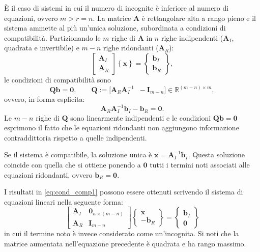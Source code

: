 È il caso di sistemi in cui il numero di incognite è inferiore 	al numero di equazioni, ovvero $m>r=n$. La matrice $\bm{A}$ è 
rettangolare alta a rango pieno e il sistema ammette al più un'unica soluzione, subordinata a condizioni di compatibilit\`a.
Partizionando le $m$ righe di $\bm{A}$ in $n$ righe indipendenti ($\bm{A}_I$, quadrata e invertibile) e $m-n$ righe ridondanti ($\bm{A}_R$):
\begin{equation}\label{eq:sist_sovrad}
	\left[ \begin{array}{c} \bm{A}_{I} \\ \hline \bm{A}_{R} \end{array} \right]
	\left\{ \bm{x}\right\}
	= \left\{ \begin{array}{c} \bm{b}_{I} \\ \hline \bm{b}_{R} \end{array} \right\},
\end{equation}
le condizioni di compatibilit\`a sono
\begin{equation}\label{eq:comp_sovrad}
	\bm{Q} \bm{b} = \bm{0},
	\qquad
	\bm{Q} := \bigl[\bm{A}_{R}\bm{A}_{I}^{-1} \;\; -\bm{I}_{m-n}\bigr] \in \mathbb{R}^{(m-n)\times m},
\end{equation}
ovvero, in forma esplicita:
\begin{equation}\label{eq:cond_comp1}
	\bm{A}_{R} \bm{A}_I^{-1} \bm{b}_{I} - \bm{b}_{R} = \bm{0}.
\end{equation}
Le $m-n$ righe di $\bm{Q}$ sono linearmente indipendenti e le condizioni
$\bm{Q}\bm{b}=\bm{0}$ esprimono il fatto che le equazioni ridondanti non
aggiungono informazione contraddittoria rispetto a quelle indipendenti.

Se il sistema \`e compatibile, la soluzione unica \`e $\bm{x} = \bm{A}_I^{-1} \bm{b}_I$. Questa soluzione coincide con quella che si ottiene ponendo a $\bm{0}$ tutti i termini noti associati alle equazioni 
ridondanti, ovvero $\bm{b}_R=\bm{0}$.

\begin{oss}
	I risultati in \eqref{eq:cond_comp1} possono essere ottenuti scrivendo il sistema di equazioni lineari nella seguente forma:
	\begin{equation}\label{sist_sovrad_AL}
		\left[ \begin{array}{c|c}
			\bm{A}_I & \bm{0}_{n \times (m-n)} \\
			\hline
			\bm{A}_R & \bm{I}_{m-n}
		\end{array} \right]
		\left\{ \begin{array}{c}
			\bm{x} \\
			\hline
			-\bm{b}_{R}
		\end{array} \right\}
		=
		\left\{ \begin{array}{c}
			\bm{b}_{I} \\
			\hline
			\bm{0}
		\end{array} \right\}
	\end{equation}
	in cui il termine noto è invece considerato come un'incognita. Si noti che la matrice aumentata nell'equazione precedente è quadrata e ha rango massimo.
\end{oss}




